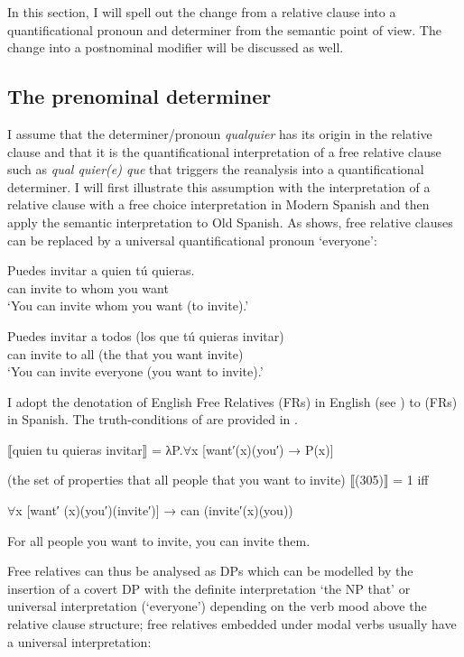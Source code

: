 In this section, I will spell out the change from a relative clause into a quantificational pronoun and determiner from the semantic point of view. The change into a postnominal modifier will be discussed as well.

\subsection{{The} {prenominal} {determiner}} \label{sec:5.3.1}

I assume that the determiner/pronoun \textit{qualquier} has its origin in the relative clause and that it is the quantificational interpretation of a free relative clause such as \textit{qual quier(e) que} that triggers the reanalysis into a quantificational determiner. I will first illustrate this assumption with the interpretation of a relative clause with a free choice interpretation in Modern Spanish and then apply the semantic interpretation to Old Spanish. As  shows, free relative clauses can be replaced by a universal quantificational pronoun ‘everyone’:

\ea \label{ex:key:305} %
 \ea 
 \gll Puedes invitar a quien tú quieras.\\
can invite to whom you want {} \\
    \glt ‘You can invite whom you want (to invite).’

\ex \gll Puedes invitar a todos (los que tú quieras invitar)\\
can invite to all (the that you want invite)\\
\glt ‘You can invite everyone (you want to invite).’  
\z
\z 

I adopt the denotation of English Free Relatives (FRs) in English (see \citealt{Simik2018}) to (FRs) in Spanish. The truth-conditions of  are provided in .

\ea \label{ex:key:306} %
\ea{} \label{ex:key:306-1}  ⟦quien tu quieras invitar⟧ = λP.${\forall}$x [want′(x)(you′) → P(x)]

(the set of properties that all people that you want to invite)
\ex{} \label{ex:key:306-2} ⟦(305)⟧ = 1 iff

{${\forall}$x [want′ (x)(you′)(invite′)] → can (invite′(x)(you))}

{For all people you want to invite, you can invite them.}
\z
\z

Free relatives can thus be analysed as DPs which can be modelled by the insertion of a covert DP with the definite interpretation ‘the NP that’ or universal interpretation (‘everyone’) depending on the verb mood above the relative clause structure; free relatives embedded under modal verbs usually have a universal interpretation:

